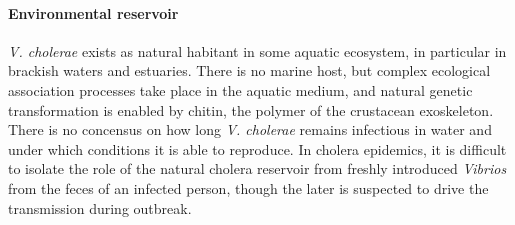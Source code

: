  \paragraph{Environmental reservoir}  \textit{V. cholerae} exists as natural habitant in some aquatic ecosystem, in particular in brackish waters and estuaries. There is no marine host, but complex ecological association processes take place in the aquatic medium, and natural genetic transformation is enabled by chitin, the polymer of the crustacean exoskeleton\cite{Reidl:VibrioCholeraeCholera:2002,Meibom:ChitinInducesNatural:2005}. There is no concensus on how long \textit{V. cholerae} remains infectious in water and under which conditions it is able to reproduce\cite{Mavian:ToxigenicVibrioCholerae:2020}. In cholera epidemics, it is difficult to isolate the role of the natural cholera reservoir from freshly introduced \textit{Vibrios} from the feces of an infected person, though the later is suspected to drive the transmission during outbreak.
 
